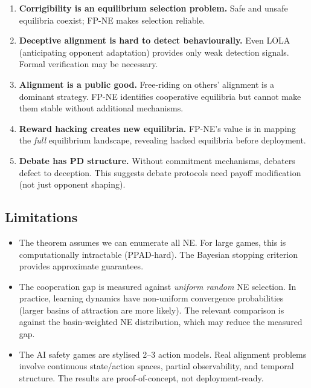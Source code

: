 \documentclass[11pt,a4paper]{article}
\begin{document}
\begin{enumerate}
    \item \textbf{Corrigibility is an equilibrium selection problem.}
    Safe and unsafe equilibria coexist; FP-NE makes selection reliable.

    \item \textbf{Deceptive alignment is hard to detect behaviourally.}
    Even LOLA (anticipating opponent adaptation) provides only weak
    detection signals. Formal verification may be necessary.

    \item \textbf{Alignment is a public good.} Free-riding on others'
    alignment is a dominant strategy. FP-NE identifies cooperative
    equilibria but cannot make them stable without additional mechanisms.

    \item \textbf{Reward hacking creates new equilibria.}
    FP-NE's value is in mapping the \emph{full} equilibrium landscape,
    revealing hacked equilibria before deployment.

    \item \textbf{Debate has PD structure.} Without commitment
    mechanisms, debaters defect to deception. This suggests debate
    protocols need payoff modification (not just opponent shaping).
\end{enumerate}


\subsection{Limitations}

\begin{itemize}
    \item The theorem assumes we can enumerate all NE. For large games,
    this is computationally intractable (PPAD-hard). The Bayesian
    stopping criterion provides approximate guarantees.

    \item The cooperation gap is measured against \emph{uniform random}
    NE selection. In practice, learning dynamics have non-uniform
    convergence probabilities (larger basins of attraction are more
    likely). The relevant comparison is against the basin-weighted
    NE distribution, which may reduce the measured gap.

    \item The AI safety games are stylised 2--3 action models.
    Real alignment problems involve continuous state/action spaces,
    partial observability, and temporal structure. The results are
    proof-of-concept, not deployment-ready.
\end{itemize}
\end{document}

